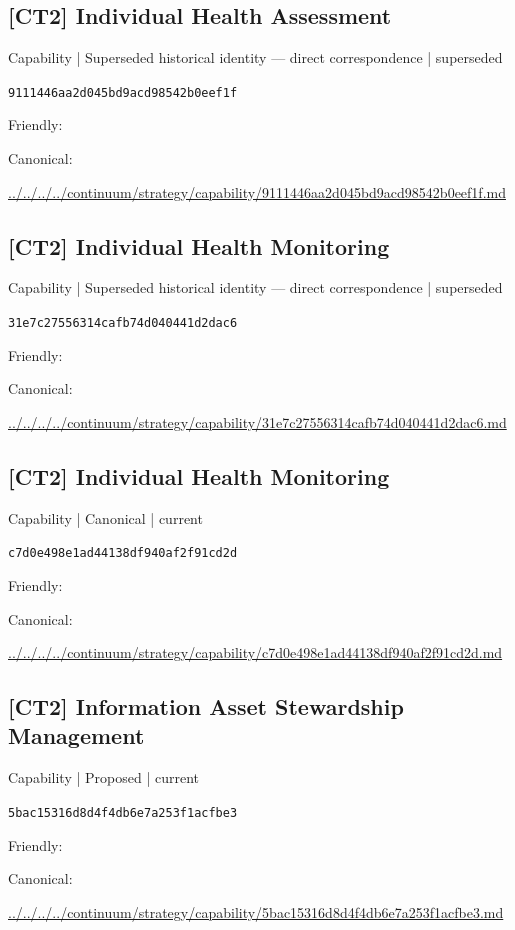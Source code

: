 \documentclass[10pt,a4paper]{article}
\begin{document}
\subsection*{[CT2] Individual Health Assessment}
{\small Capability | Superseded historical identity — direct correspondence | superseded}\par
\texttt{9111446aa2d045bd9acd98542b0eef1f}\par
Friendly: \par
Canonical: \par
{\footnotesize\url{../../../../continuum/strategy/capability/9111446aa2d045bd9acd98542b0eef1f.md}}\par
\subsection*{[CT2] Individual Health Monitoring}
{\small Capability | Superseded historical identity — direct correspondence | superseded}\par
\texttt{31e7c27556314cafb74d040441d2dac6}\par
Friendly: \par
Canonical: \par
{\footnotesize\url{../../../../continuum/strategy/capability/31e7c27556314cafb74d040441d2dac6.md}}\par
\subsection*{[CT2] Individual Health Monitoring}
{\small Capability | Canonical | current}\par
\texttt{c7d0e498e1ad44138df940af2f91cd2d}\par
Friendly: \par
Canonical: \par
{\footnotesize\url{../../../../continuum/strategy/capability/c7d0e498e1ad44138df940af2f91cd2d.md}}\par
\subsection*{[CT2] Information Asset Stewardship Management}
{\small Capability | Proposed | current}\par
\texttt{5bac15316d8d4f4db6e7a253f1acfbe3}\par
Friendly: \par
Canonical: \par
{\footnotesize\url{../../../../continuum/strategy/capability/5bac15316d8d4f4db6e7a253f1acfbe3.md}}\par
\end{document}
